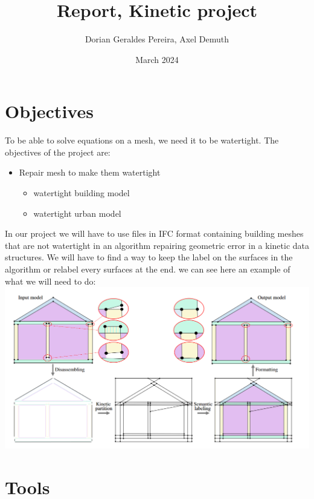 \documentclass{article}
\title{Report, Kinetic project}
\author{Dorian Geraldes Pereira, Axel Demuth}
\date{March 2024}
\begin{document}
\maketitle
\tableofcontents
\newpage


\section{Objectives}
To be able to solve equations on a mesh, we need it to be watertight.
\newline The objectives of the project are:
\newline
\begin{itemize}
    \item Repair mesh to make them watertight
    \newline
    \begin{itemize}
        \item watertight building model
        \newline
        \item watertight urban model
    \end{itemize} 
\end{itemize} 

In our project we will have to use files in IFC format containing building meshes that are not watertight in an algorithm repairing
geometric error in a kinetic data structures. We will have to find a way to keep the label 
on the surfaces in the algorithm or relabel every surfaces at the end.
we can see here an example of what we will need to do:\newline
\includegraphics[scale = 0.37]{../../images/example_algorithm_2.png}



\section{Tools}
\end{document}
